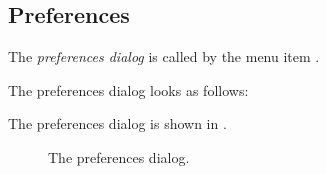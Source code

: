 \subsection{Preferences}
The {\em preferences dialog} is called by the menu item
.
\begin{htmlonly}
The preferences dialog looks as follows:
\end{htmlonly}
\begin{latexonly}
The preferences dialog is shown in .
\begin{figure}[ht]
\begin{center}
\caption{The preferences dialog.}\label{fig:oprefs}
\ifpdf
{}
\else
{}
\fi
\end{center}
\end{figure}
\end{latexonly}
